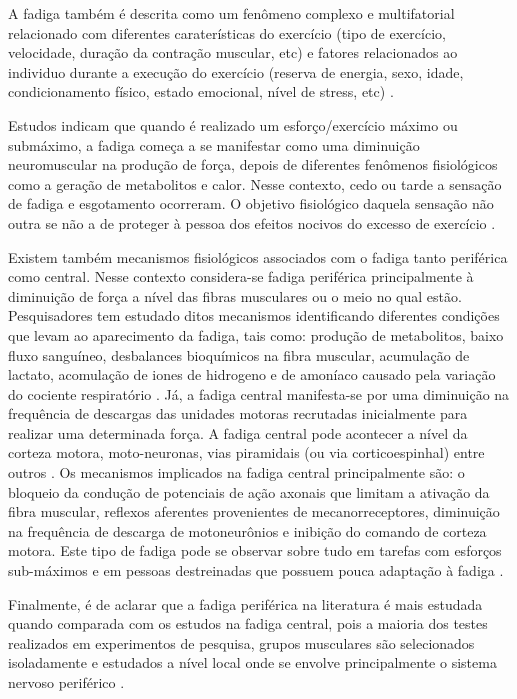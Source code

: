 A fadiga também é descrita como um fenômeno complexo e multifatorial relacionado com diferentes caraterísticas do exercício (tipo de exercício, velocidade, duração da contração muscular, etc) e fatores relacionados ao individuo durante a execução do exercício (reserva de energia, sexo, idade, condicionamento físico, estado emocional, nível de stress, etc) \cite{Ament2009ExerciseFatigue.}.

Estudos indicam que quando é realizado um esforço/exercício máximo ou submáximo, a fadiga começa a se manifestar como uma diminuição neuromuscular na produção de força, depois de diferentes fenômenos fisiológicos como a geração de metabolitos e calor\cite{Ament2009ExerciseFatigue.}. Nesse contexto, cedo ou tarde a sensação de fadiga e esgotamento ocorreram. O objetivo fisiológico daquela sensação não outra se não a de proteger à pessoa dos efeitos nocivos do excesso de exercício \cite{Zory2005CentralElectromyostimulation}.

Existem também mecanismos fisiológicos associados com o fadiga tanto periférica como central. Nesse contexto considera-se fadiga periférica principalmente à diminuição de força a nível das fibras musculares ou o meio no qual estão. Pesquisadores tem estudado ditos mecanismos identificando diferentes condições que levam ao aparecimento da fadiga, tais como: produção de metabolitos, baixo fluxo sanguíneo, desbalances bioquímicos na fibra muscular, acumulação de lactato, acomulação de iones de hidrogeno e de amoníaco causado pela variação do cociente respiratório \cite{ArceRodriguez2015PhysiologicalFatigue, Vollestad1997MeasurementFatigue}. Já, a fadiga central manifesta-se por uma diminuição na frequência de descargas das unidades motoras recrutadas inicialmente para realizar uma determinada força. A fadiga central pode acontecer a nível da corteza motora, moto-neuronas, vias piramidais (ou via corticoespinhal) entre outros \cite{Westerblad2002MuscleCause}. Os mecanismos implicados na fadiga central principalmente são: o bloqueio da condução de potenciais de ação axonais que limitam a ativação da fibra muscular, reflexos aferentes provenientes de mecanorreceptores, diminuição na frequência de descarga de motoneurônios e inibição do comando de corteza motora. Este tipo de fadiga pode se observar sobre tudo em tarefas com esforços sub-máximos e em pessoas destreinadas que possuem pouca adaptação à fadiga \cite{ArceRodriguez2015PhysiologicalFatigue, Westerblad2002MuscleCause, Ascensao2003FisiologiaPeriferica}.

Finalmente, é de aclarar que a fadiga periférica na literatura é mais estudada quando comparada com os estudos na fadiga central, pois a maioria dos testes realizados em experimentos de pesquisa, grupos musculares são selecionados isoladamente e estudados a nível local onde se envolve principalmente o sistema nervoso periférico \cite{ArceRodriguez2015PhysiologicalFatigue}.

